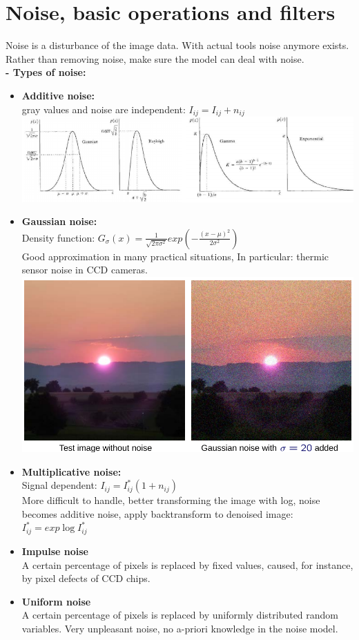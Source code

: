 \documentclass{article}
\begin{document}
\section{Noise, basic operations and filters}
Noise is a disturbance of the image data. With actual tools noise anymore exists. Rather than removing noise, make sure the model can deal with noise.\\
\textbf{- Types of noise: }\\
\begin{itemize}
    \item \textbf{Additive noise: }\\
    gray values and noise are independent: $I_{ij} = I_{ij}+n_{ij}$\\
    \includegraphics[scale=0.4]{15.png}
    \item \textbf{Gaussian noise: }\\
    Density function: $G_\sigma(x)=\frac{1}{\sqrt{2\pi \sigma^2}}exp(-\frac{(x-\mu)^2}{2\sigma^2})$\\
    Good approximation in many practical situations, In particular: thermic sensor noise in CCD cameras.\\
    \includegraphics[scale=0.4]{16.png}
    \item \textbf{Multiplicative noise:}\\
    Signal dependent: $I_{ij}=I_{ij}^*(1+n_{ij})$\\
    More difficult to handle, better transforming the image with log, noise becomes additive noise, apply backtransform to denoised image: $I_{ij}^*=exp \log I_{ij}^*$
    \item \textbf{Impulse noise}\\
    A certain percentage of pixels is replaced by fixed values, caused, for instance, by pixel defects of CCD chips.
    \item \textbf{Uniform noise}\\
    A certain percentage of pixels is replaced by uniformly distributed random variables. Very unpleasant noise, no a-priori knowledge in the noise model.
\end{itemize}
\end{document}
